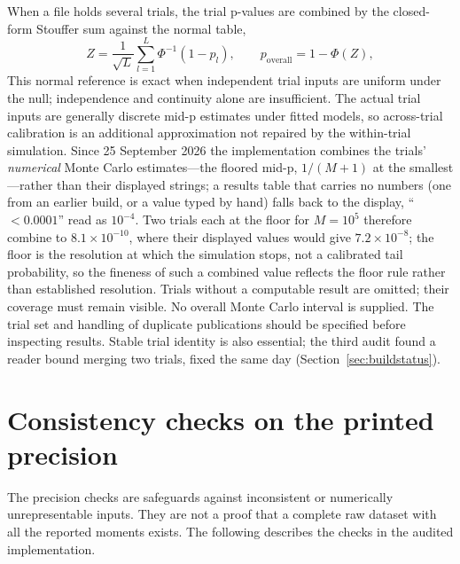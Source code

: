 \documentclass[11pt,a4paper]{article}
\begin{document}
When a file holds several trials, the trial p-values are combined by the closed-form Stouffer sum against the normal table,
\begin{equation}
Z = \frac{1}{\sqrt{L}} \sum_{l=1}^{L} \Phi^{-1}(1 - p_l), \qquad p_{\mathrm{overall}} = 1 - \Phi(Z),
\end{equation}
This normal reference is exact when independent trial inputs are uniform under the null; independence and continuity alone are insufficient. The actual trial inputs are generally discrete mid-p estimates under fitted models, so across-trial calibration is an additional approximation not repaired by the within-trial simulation. Since 25 September 2026 the implementation combines the trials' \emph{numerical} Monte Carlo estimates---the floored mid-p, $1/(M+1)$ at the smallest---rather than their displayed strings; a results table that carries no numbers (one from an earlier build, or a value typed by hand) falls back to the display, ``$<0.0001$'' read as $10^{-4}$. Two trials each at the floor for $M = 10^{5}$ therefore combine to $8.1 \times 10^{-10}$, where their displayed values would give $7.2 \times 10^{-8}$; the floor is the resolution at which the simulation stops, not a calibrated tail probability, so the fineness of such a combined value reflects the floor rule rather than established resolution. Trials without a computable result are omitted; their coverage must remain visible. No overall Monte Carlo interval is supplied. The trial set and handling of duplicate publications should be specified before inspecting results. Stable trial identity is also essential; the third audit found a reader bound merging two trials, fixed the same day (Section~\ref{sec:buildstatus}).

\section{Consistency checks on the printed precision}
\label{sec:precision}

The precision checks are safeguards against inconsistent or numerically unrepresentable inputs. They are not a proof that a complete raw dataset with all the reported moments exists. The following describes the checks in the audited implementation.
\end{document}
